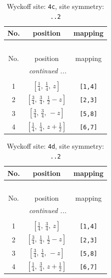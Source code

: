 \documentclass[fleqn,8pt]{jsarticle}
\begin{document}
\renewcommand{\arraystretch}{1.2}
\begin{longtable}{ccc}
\caption{Wyckoff site: {\tt 4c}, site symmetry: {\tt ..2}}
 \\
 \hline \hline
No. & position & mapping \\ \hline \endfirsthead

\multicolumn{2}{l}{\tablename\ \thetable{}} \\
 \hline \hline
No. & position & mapping \\ \hline \endhead

 \hline \hline
\multicolumn{2}{r}{\footnotesize\it continued ...} \\ \endfoot

 \hline \hline
\multicolumn{2}{r}{} \\ \endlastfoot

1 & $\left[ \frac{1}{4},\, \frac{1}{4},\, z \right]$ & {\tt [1,4]} \\ \hline
2 & $\left[ \frac{3}{4},\, \frac{3}{4},\, \frac{1}{2} - z \right]$ & {\tt [2,3]} \\ \hline
3 & $\left[ \frac{3}{4},\, \frac{3}{4},\, - z \right]$ & {\tt [5,8]} \\ \hline
4 & $\left[ \frac{1}{4},\, \frac{1}{4},\, z + \frac{1}{2} \right]$ & {\tt [6,7]} \\
\end{longtable}
\renewcommand{\arraystretch}{1.2}
\begin{longtable}{ccc}
\caption{Wyckoff site: {\tt 4d}, site symmetry: {\tt ..2}}
 \\
 \hline \hline
No. & position & mapping \\ \hline \endfirsthead

\multicolumn{2}{l}{\tablename\ \thetable{}} \\
 \hline \hline
No. & position & mapping \\ \hline \endhead

 \hline \hline
\multicolumn{2}{r}{\footnotesize\it continued ...} \\ \endfoot

 \hline \hline
\multicolumn{2}{r}{} \\ \endlastfoot

1 & $\left[ \frac{1}{4},\, \frac{3}{4},\, z \right]$ & {\tt [1,4]} \\ \hline
2 & $\left[ \frac{3}{4},\, \frac{1}{4},\, \frac{1}{2} - z \right]$ & {\tt [2,3]} \\ \hline
3 & $\left[ \frac{3}{4},\, \frac{1}{4},\, - z \right]$ & {\tt [5,8]} \\ \hline
4 & $\left[ \frac{1}{4},\, \frac{3}{4},\, z + \frac{1}{2} \right]$ & {\tt [6,7]} \\
\end{longtable}
\end{document}
